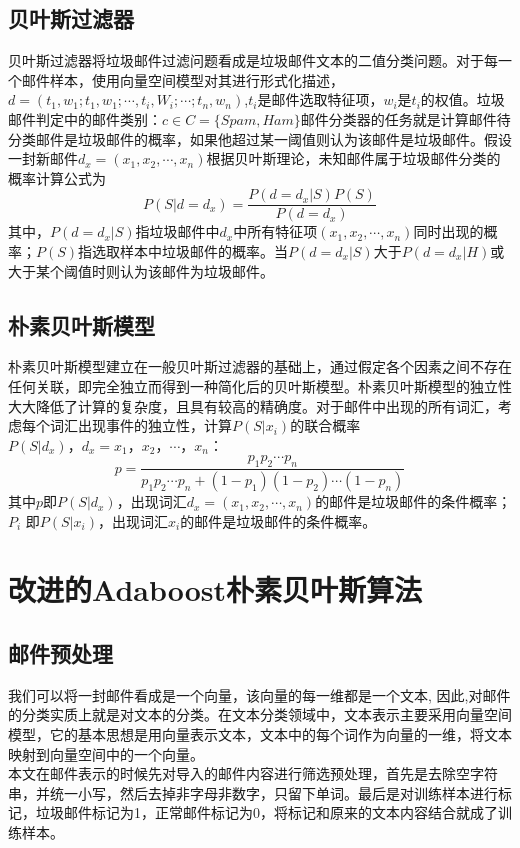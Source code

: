 \documentclass[a4paper,11pt,onecolumn,twoside]{article}
\begin{document}
\begin{multicols}{2}
\subsection{贝叶斯过滤器}
贝叶斯过滤器将垃圾邮件过滤问题看成是垃圾邮件文本的二值分类问题。对于每一个邮件样本，使用向量空间模型对其进行形式化描述，$d=(t_1,w_1;t_1,w_1;\cdots,t_i,W_i;\cdots;t_n,w_n)$,$t_i$是邮件选取特征项，$w_i$是$t_i$的权值。垃圾邮件判定中的邮件类别：$c \in C=\{Spam,Ham\}$邮件分类器的任务就是计算邮件待分类邮件是垃圾邮件的概率，如果他超过某一阈值则认为该邮件是垃圾邮件。假设一封新邮件$d_x=(x_1,x_2,\cdots,x_n)$根据贝叶斯理论，未知邮件属于垃圾邮件分类的概率计算公式为
\begin{equation}
P(S|d=d_x)=\frac{P(d=d_x|S)P(S)}{P(d=d_x)}
\end{equation}
其中，$P(d=d_x|S)$指垃圾邮件中$d_x$中所有特征项$(x_1,x_2,\cdots,x_n)$同时出现的概率；$P(S)$指选取样本中垃圾邮件的概率。当$P(d=d_x|S)$大于$P(d=d_x|H)$或大于某个阈值时则认为该邮件为垃圾邮件\cite{Li}。

\subsection{朴素贝叶斯模型}
朴素贝叶斯模型建立在一般贝叶斯过滤器的基础上，通过假定各个因素之间不存在任何关联，即完全独立而得到一种简化后的贝叶斯模型\cite{Yan}。朴素贝叶斯模型的独立性大大降低了计算的复杂度，且具有较高的精确度。对于邮件中出现的所有词汇，考虑每个词汇出现事件的独立性，计算$P(S|x_i)$的联合概率$P(S|d_x)，d_x={x_1，x_2，\cdots，x_n}$：
\begin{equation}
p=\frac{p_1p_2 \cdots p_n}{p_1p_2 \cdots p_n+(1-p_1)(1-p_2) \cdots (1-p_n)}
\end{equation}
其中$p$即$P(S|d_x)$，出现词汇$d_x=(x_1,x_2,\cdots,x_n)$的邮件是垃圾邮件的条件概率；$P_i$ 即$P(S|x_i)$，出现词汇$x_i$的邮件是垃圾邮件的条件概率。

\section{改进的Adaboost朴素贝叶斯算法}
\subsection{邮件预处理}
我们可以将一封邮件看成是一个向量，该向量的每一维都是一个文本, 因此,对邮件的分类实质上就是对文本的分类。在文本分类领域中，文本表示主要采用向量空间模型，它的基本思想是用向量表示文本，文本中的每个词作为向量的一维，将文本映射到向量空间中的一个向量。\\
\indent 本文在邮件表示的时候先对导入的邮件内容进行筛选预处理，首先是去除空字符串，并统一小写，然后去掉非字母非数字，只留下单词。最后是对训练样本进行标记，垃圾邮件标记为1，正常邮件标记为0，将标记和原来的文本内容结合就成了训练样本。

\end{multicols}
\end{document}
